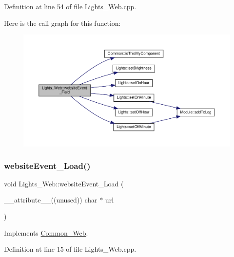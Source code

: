 Definition at line 54 of file Lights\+\_\+\+Web.\+cpp.

Here is the call graph for this function\+:
\nopagebreak
\begin{figure}[H]
\begin{center}
\leavevmode
\includegraphics[width=350pt]{class_lights___web_a8e4f0fc6e2cba4303c306910b9c9ac86_cgraph}
\end{center}
\end{figure}
\mbox{\label{class_lights___web_afab1fbd6391d25ab5f382b89d4a02b5e}} 
\subsubsection{\texorpdfstring{website\+Event\+\_\+\+Load()}{websiteEvent\_Load()}}
{\footnotesize\ttfamily void Lights\+\_\+\+Web\+::website\+Event\+\_\+\+Load (\begin{DoxyParamCaption}\item[{\+\_\+\+\_\+attribute\+\_\+\+\_\+((unused)) char $\ast$}]{url }\end{DoxyParamCaption})\hspace{0.3cm}{\ttfamily [virtual]}}



Implements \hyperlink{class_common___web_a5ce0d5ce6f63279c3b624371d8a76211}{Common\+\_\+\+Web}.



Definition at line 15 of file Lights\+\_\+\+Web.\+cpp.

